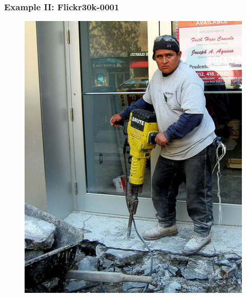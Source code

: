 \documentclass[aspectratio=169]{beamer}
\begin{document}
\begin{frame}[fragile]
\end{frame}

\begin{frame}[fragile]
	\frametitle{Example II: Flickr30k-0001}
    \begin{minipage}{.50\textwidth}
    \begin{figure}
        \centering
        \includegraphics[width=1.0\textwidth]{images/13651137.jpg} 

\end{figure}
\end{minipage}
\end{frame}
\end{document}
